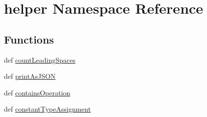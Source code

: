 \hypertarget{namespacehelper}{\section{helper Namespace Reference}
\label{namespacehelper}
}
\subsection*{Functions}
\begin{DoxyCompactItemize}
\item 
def \hyperlink{namespacehelper_a3d373960e19a1cccb14a3ea3d8a290fc}{count\-Leading\-Spaces}
\item 
def \hyperlink{namespacehelper_ac9982ec8fcc3a8754106f2887acde288}{print\-As\-J\-S\-O\-N}
\item 
def \hyperlink{namespacehelper_a83cee7332076af713f97e0c60fd42846}{contains\-Operation}
\item 
def \hyperlink{namespacehelper_a9f40a6844855f772047a1f45f3a6d00e}{constant\-Type\-Assignment}
\end{DoxyCompactItemize}


